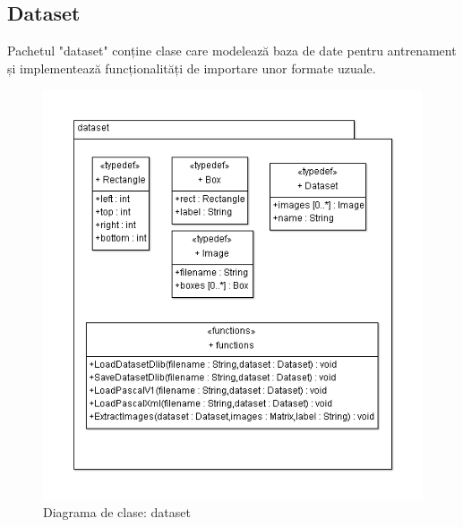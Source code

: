 \subsection{Dataset}


Pachetul "dataset" conține clase care modelează baza de date pentru antrenament și implementează funcționalități de importare unor formate uzuale.
\begin{figure}[H]
	\centering
	\includegraphics[width=1.0\textwidth]{uml/datasetClassDiagram.png}
	\caption{Diagrama de clase: dataset}
	\label{fig:datasetClassDiagram}
\end{figure}

